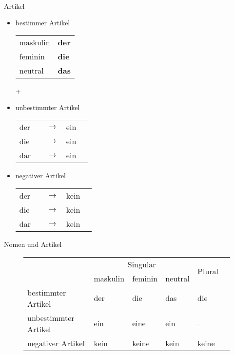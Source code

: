 \begin{syntax}{Artikel}{}

\begin{itemize}
	\item bestimmer Artikel
	\begin{mdframed}
		\begin{tabular}{ll}
			maskulin & \textbf{der} \\
			feminin & \textbf{die} \\
			neutral & \textbf{das}
		\end{tabular} + \ssthere
	\end{mdframed}

	\item unbestimmter Artikel
	\begin{mdframed}
		\begin{tabular}{lllll}
			der & \ssthere & $\rightarrow$ & ein & \ssthere \\
			die & \ssthere & $\rightarrow$ & ein\att{e} & \ssthere \\
			dar & \ssthere & $\rightarrow$ & ein & \ssthere
		\end{tabular}
	\end{mdframed}

	\item negativer Artikel
	\begin{mdframed}
		\begin{tabular}{lllll}
			der & \ssthere & $\rightarrow$ & kein & \ssthere \\
			die & \ssthere & $\rightarrow$ & kein\att{e} & \ssthere \\
			dar & \ssthere & $\rightarrow$ & kein & \ssthere
		\end{tabular}
	\end{mdframed}
\end{itemize}

Nomen und Artikel
\begin{figure}[H]
\begin{tabular}{l|ll|ll|ll|ll}
\hline
	& \multicolumn{6}{c|}{Singular} & \multirow{2}{*}{Plural} & \\
\cline{1-7}
	& \multicolumn{2}{l|}{maskulin} & \multicolumn{2}{l|}{feminin} & \multicolumn{2}{l|}{neutral} & & \\
\hline
	bestimmter Artikel & der & \ssthere & die & \ssthere & das & \ssthere & die & \ssthere \\
	unbestimmter Artikel & ein & \ssthere & eine & \ssthere & ein & \ssthere & -- & \ssthere \\
	negativer Artikel & kein & \ssthere & keine & \ssthere & kein & \ssthere & keine & \ssthere \\
\hline
\end{tabular}
\end{figure}
\end{syntax}
